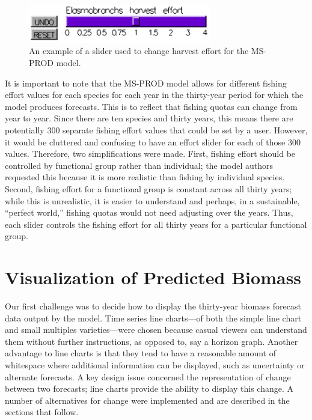 \begin{figure}[h]
	\centering
	\includegraphics[width=8cm]{figures/png/slider.png}
	\caption[An example of a slider used to change harvest effort for the MS-PROD model]{An example of a slider used to change harvest effort for the MS-PROD model.}
	\label{fig:slider}
\end{figure}

It is important to note that the MS-PROD model allows for different fishing effort values for each species for each year in the thirty-year period for which the model produces forecasts.  This is to reflect that fishing quotas can change from year to year.  Since there are ten species and thirty years, this means there are potentially 300 separate fishing effort values that could be set by a user.  However, it would be cluttered and confusing to have an effort slider for each of those 300 values.  Therefore, two simplifications were made.  First, fishing effort should be controlled by functional group rather than individual; the model authors requested this because it is more realistic than fishing by individual species.  Second, fishing effort for a functional group is constant across all thirty years; while this is unrealistic, it is easier to understand and perhaps, in a sustainable, ``perfect world,'' fishing quotas would not need adjusting over the years.  Thus, each slider controls the fishing effort for all thirty years for a particular functional group.

\section{Visualization of Predicted Biomass}

Our first challenge was to decide how to display the thirty-year biomass forecast data output by the model.  Time series line charts---of both the simple line chart and small multiples varieties---were chosen because casual viewers can understand them without further instructions, as opposed to, say a horizon graph.  Another advantage to line charts is that they tend to have a reasonable amount of whitespace where additional information can be displayed, such as uncertainty or alternate forecasts. A key design issue concerned the representation of change between two forecasts; line charts provide the ability to display this change.  A number of alternatives for change were implemented and are described in the sections that follow.

